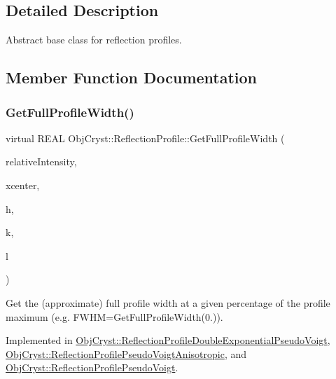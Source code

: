 \subsection{Detailed Description}
Abstract base class for reflection profiles. 

\subsection{Member Function Documentation}
\mbox{\label{class_obj_cryst_1_1_reflection_profile_ac6d2a69e63c3efd06f30ab134062bbc0}} 
\subsubsection{\texorpdfstring{GetFullProfileWidth()}{GetFullProfileWidth()}}
{\footnotesize\ttfamily virtual R\+E\+AL Obj\+Cryst\+::\+Reflection\+Profile\+::\+Get\+Full\+Profile\+Width (\begin{DoxyParamCaption}\item[{const R\+E\+AL}]{relative\+Intensity,  }\item[{const R\+E\+AL}]{xcenter,  }\item[{const R\+E\+AL}]{h,  }\item[{const R\+E\+AL}]{k,  }\item[{const R\+E\+AL}]{l }\end{DoxyParamCaption})\hspace{0.3cm}{\ttfamily [pure virtual]}}

Get the (approximate) full profile width at a given percentage of the profile maximum (e.\+g. F\+W\+HM=Get\+Full\+Profile\+Width(0.)). 

Implemented in \mbox{\hyperlink{class_obj_cryst_1_1_reflection_profile_double_exponential_pseudo_voigt_a92a2e4fd2b10e0edc07b338b79b59418}{Obj\+Cryst\+::\+Reflection\+Profile\+Double\+Exponential\+Pseudo\+Voigt}}, \mbox{\hyperlink{class_obj_cryst_1_1_reflection_profile_pseudo_voigt_anisotropic_a43a9c77aa312df5ca00969c7f866f7a4}{Obj\+Cryst\+::\+Reflection\+Profile\+Pseudo\+Voigt\+Anisotropic}}, and \mbox{\hyperlink{class_obj_cryst_1_1_reflection_profile_pseudo_voigt_aab311ae897daf5e738eb7727e57fd0c7}{Obj\+Cryst\+::\+Reflection\+Profile\+Pseudo\+Voigt}}.

